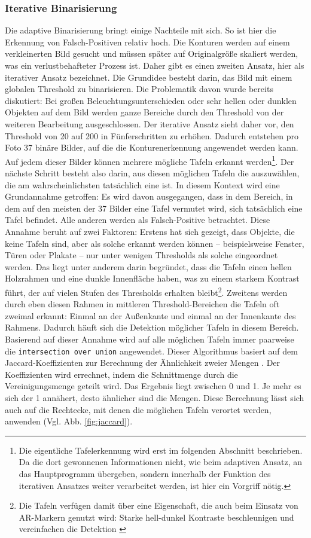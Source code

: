 \subsubsection*{Iterative Binarisierung}

Die adaptive Binarisierung bringt einige Nachteile mit sich. So ist hier die Erkennung von Falsch-Positiven relativ hoch. Die Konturen werden auf einem verkleinerten Bild gesucht und müssen später auf Originalgröße skaliert werden, was ein verlustbehafteter Prozess ist. Daher gibt es einen zweiten Ansatz, hier als iterativer Ansatz bezeichnet. Die Grundidee besteht darin, das Bild mit einem globalen Threshold zu binarisieren. Die Problematik davon wurde bereits diskutiert: Bei großen Beleuchtungsunterschieden oder sehr hellen oder dunklen Objekten auf dem Bild werden ganze Bereiche durch den Threshold von der weiteren Bearbeitung ausgeschlossen. Der iterative Ansatz sieht daher vor, den Threshold von 20 auf 200 in Fünferschritten zu erhöhen. Dadurch entstehen pro Foto 37 binäre Bilder, auf die die Konturenerkennung angewendet werden kann. Auf jedem dieser Bilder können mehrere mögliche Tafeln erkannt werden\footnote{Die eigentliche Tafelerkennung wird erst im folgenden Abschnitt beschrieben. Da die dort gewonnenen Informationen nicht, wie beim adaptiven Ansatz, an das Hauptprogramm übergeben, sondern innerhalb der Funktion des iterativen Ansatzes weiter verarbeitet werden, ist hier ein Vorgriff nötig.}. Der nächste Schritt besteht also darin, aus diesen möglichen Tafeln die auszuwählen, die am wahrscheinlichsten tatsächlich eine ist. In diesem Kontext wird eine Grundannahme getroffen: Es wird davon ausgegangen, dass in dem Bereich, in dem auf den meisten der 37 Bilder eine Tafel vermutet wird, sich tatsächlich eine Tafel befindet. Alle anderen werden als Falsch-Positive betrachtet. Diese Annahme beruht auf zwei Faktoren: Erstens hat sich gezeigt, dass Objekte, die keine Tafeln sind, aber als solche erkannt werden können -- beispielsweise Fenster, Türen oder Plakate -- nur unter wenigen Thresholds als solche eingeordnet werden. Das liegt unter anderem darin begründet, dass die Tafeln einen hellen Holzrahmen und eine dunkle Innenfläche haben, was zu einem starkem Kontrast führt, der auf vielen Stufen des Thresholds erhalten bleibt\footnote{Die Tafeln verfügen damit über eine Eigenschaft, die auch beim Einsatz von AR-Markern genutzt wird: Starke hell-dunkel Kontraste beschleunigen und vereinfachen die Detektion \cite[p.~45]{armarker}}. Zweitens werden durch eben diesen Rahmen in mittleren Threshold-Bereichen die Tafeln oft zweimal erkannt: Einmal an der Außenkante und einmal an der Innenkante des Rahmens. Dadurch häuft sich die Detektion möglicher Tafeln in diesem Bereich.
Basierend auf dieser Annahme wird auf alle möglichen Tafeln immer paarweise die \verb|intersection over union| angewendet. Dieser Algorithmus basiert auf dem Jaccard-Koeffizienten zur Berechnung der Ähnlichkeit zweier Mengen \cite{intersectionoverunion}. Der Koeffizienten wird errechnet, indem die Schnittmenge durch die Vereinigungsmenge geteilt wird. Das Ergebnis liegt zwischen 0 und 1. Je mehr es sich der 1 annähert, desto ähnlicher sind die Mengen. Diese Berechnung lässt sich auch auf die Rechtecke, mit denen die möglichen Tafeln verortet werden, anwenden (Vgl. Abb. \ref{fig:jaccard}).

